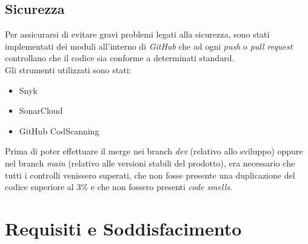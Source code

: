 \documentclass[a4paper, 11pt]{article}
\begin{document}
\subsection{Sicurezza}
Per assicurarsi di evitare gravi problemi legati alla sicurezza, sono stati implementati dei moduli all'interno di \textit{GitHub} che ad ogni \textit{push} o \textit{pull request} controllano che il codice sia conforme a determinati standard.\\
Gli strumenti utilizzati sono stati:
\begin{itemize}
    \item Snyk
    \item SonarCloud
    \item GitHub CodScanning
\end{itemize}
Prima di poter effettuare il merge nei branch \textit{dev} (relativo allo sviluppo) oppure nel branch \textit{main} (relativo alle versioni stabili del prodotto), era necessario che tutti i controlli venissero superati, che non fosse presente una duplicazione del codice superiore al $3\%$ e che non fossero presenti \textit{code smells}.\\
\section{Requisiti e Soddisfacimento}
\end{document}
